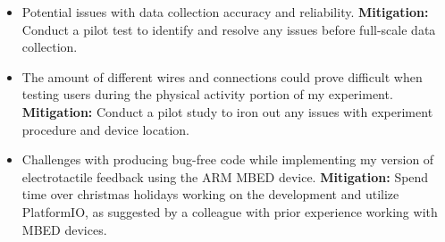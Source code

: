 \documentclass[11pt]{article}
\begin{document}
\begin{itemize}
    \item Potential issues with data collection accuracy and reliability. \textbf{Mitigation:} Conduct a pilot test to identify and resolve any issues before full-scale data collection.
    \item The amount of different wires and connections could prove difficult when testing users during the physical activity portion of my experiment. \textbf{Mitigation:} Conduct a pilot study to iron out any issues with experiment procedure and device location.
    \item Challenges with producing bug-free code while implementing my version of electrotactile feedback using the ARM MBED device. \textbf{Mitigation:} Spend time over christmas holidays working on the development and utilize PlatformIO, as suggested by a colleague with prior experience working with MBED devices.

\end{itemize}
\end{document}

